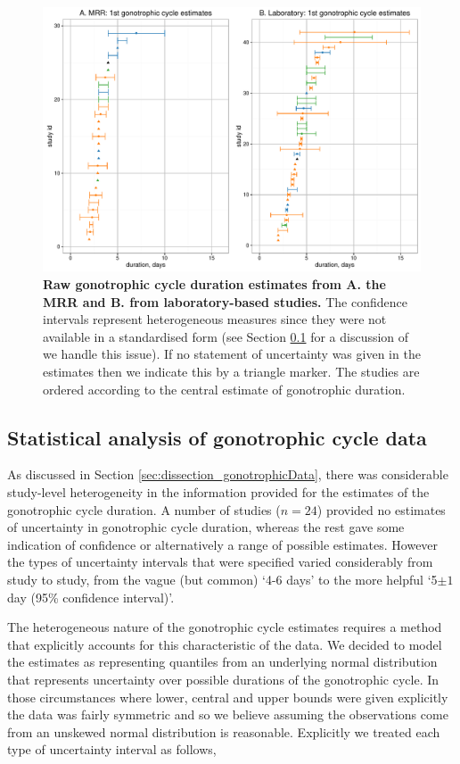 \documentclass[12pt]{article}
\begin{document}
{\begin{figure}[ht]
	\centerline{\includegraphics[width=1\textwidth]{./Figure_files/dissection_gonotrophicCycleRaw_MRRVsLab.pdf}}
	\caption{\textbf{Raw gonotrophic cycle duration estimates from A. the MRR and B. from laboratory-based studies.} The confidence intervals represent heterogeneous measures since they were not available in a standardised form (see Section \ref{sec:dissection_gonotrophicMethod} for a discussion of we handle this issue). If no statement of uncertainty was given in the estimates then we indicate this by a triangle marker. The studies are ordered according to the central estimate of gonotrophic duration.}\label{fig:dissection_gonotrophicCycleRaw_MRRVsLab}
\end{figure}

\subsection{Statistical analysis of gonotrophic cycle data}\label{sec:dissection_gonotrophicMethod}
As discussed in Section \ref{sec:dissection_gonotrophicData}, there was considerable study-level heterogeneity in the information provided for the estimates of the gonotrophic cycle duration. A number of studies ($n=24$) provided no estimates of uncertainty in gonotrophic cycle duration, whereas the rest gave some indication of confidence or alternatively a range of possible estimates. However the types of uncertainty intervals that were specified varied considerably from study to study, from the vague (but common)  `4-6 days' to the more helpful `5$\pm 1$ day (95\% confidence interval)'. 

The heterogeneous nature of the gonotrophic cycle estimates requires a method that explicitly accounts for this characteristic of the data. We decided to model the estimates as representing quantiles from an underlying normal distribution that represents uncertainty over possible durations of the gonotrophic cycle. In those circumstances where lower, central and upper bounds were given explicitly the data was fairly symmetric and so we believe assuming the observations come from an unskewed normal distribution is reasonable. Explicitly we treated each type of uncertainty interval as follows,

}
\end{document}
